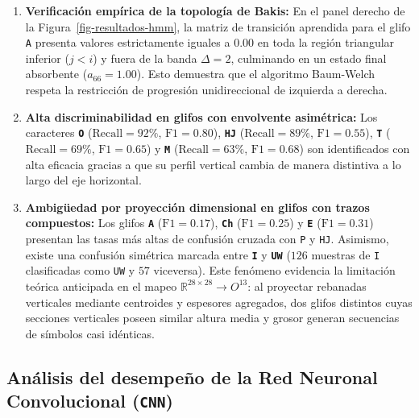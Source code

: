 \documentclass[
  spanish,
  us-letterpaper,
]{scrreprt}
\providecommand{\tightlist}{%
  \setlength{\itemsep}{0pt}\setlength{\parskip}{0pt}}
\theoremstyle{definition}
\theoremstyle{remark}
\begin{document}
\begin{enumerate}
\def\labelenumi{\arabic{enumi}.}
\tightlist
\item
  \textbf{Verificación empírica de la topología de Bakis:} En el panel
  derecho de la Figura~\ref{fig-resultados-hmm}, la matriz de transición
  aprendida para el glifo \texttt{A} presenta valores estrictamente
  iguales a \(0.00\) en toda la región triangular inferior (\(j < i\)) y
  fuera de la banda \(\Delta = 2\), culminando en un estado final
  absorbente (\(a_{66} = 1.00\)). Esto demuestra que el algoritmo
  Baum-Welch respeta la restricción de progresión unidireccional de
  izquierda a derecha.
\item
  \textbf{Alta discriminabilidad en glifos con envolvente asimétrica:}
  Los caracteres \textbf{\texttt{O}} (\(\text{Recall} = 92\%\),
  \(\text{F1} = 0.80\)), \textbf{\texttt{HJ}} (\(\text{Recall} = 89\%\),
  \(\text{F1} = 0.55\)), \textbf{\texttt{T}} (\(\text{Recall} = 69\%\),
  \(\text{F1} = 0.65\)) y \textbf{\texttt{M}} (\(\text{Recall} = 63\%\),
  \(\text{F1} = 0.68\)) son identificados con alta eficacia gracias a
  que su perfil vertical cambia de manera distintiva a lo largo del eje
  horizontal.
\item
  \textbf{Ambigüedad por proyección dimensional en glifos con trazos
  compuestos:} Los glifos \textbf{\texttt{A}} (\(\text{F1} = 0.17\)),
  \textbf{\texttt{Ch}} (\(\text{F1} = 0.25\)) y \textbf{\texttt{E}}
  (\(\text{F1} = 0.31\)) presentan las tasas más altas de confusión
  cruzada con \texttt{P} y \texttt{HJ}. Asimismo, existe una confusión
  simétrica marcada entre \textbf{\texttt{I}} y \textbf{\texttt{UW}}
  (\(126\) muestras de \texttt{I} clasificadas como \texttt{UW} y \(57\)
  viceversa). Este fenómeno evidencia la limitación teórica anticipada
  en el mapeo \(\mathbb{R}^{28 \times 28} \to O^{13}\): al proyectar
  rebanadas verticales mediante centroides y espesores agregados, dos
  glifos distintos cuyas secciones verticales poseen similar altura
  media y grosor generan secuencias de símbolos casi idénticas.
\end{enumerate}

\subsection{\texorpdfstring{Análisis del desempeño de la Red Neuronal
Convolucional
(\texttt{CNN})}{Análisis del desempeño de la Red Neuronal Convolucional (CNN)}}\label{anuxe1lisis-del-desempeuxf1o-de-la-red-neuronal-convolucional-cnn}
\end{document}
